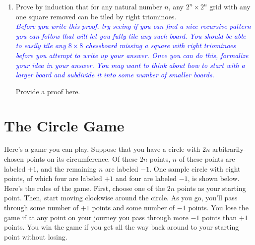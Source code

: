 \documentclass{article}
\renewcommand{\(}{\left(}
\renewcommand{\)}{\right)}
\theoremstyle{plain}
\theoremstyle{plain}
\theoremstyle{definition}
\newcommand{\annotate}[1]{\textit{\textcolor{blue}{#1}}}
\begin{document}
\begin{enumerate}[resume*]
    \item Prove by induction that for any natural number $n$, any $2^n \times 2^n$ grid with any one square removed can be tiled by right triominoes. \\

    \annotate{Before you write this proof, try seeing if you can  find a nice recursive pattern you can follow that will let you fully tile any such board. You should be able to easily tile any $8 \times 8$ chessboard missing a square with right triominoes before you attempt to write up your answer. Once you can do this, formalize your idea in your answer. You may want to think about how to start with a larger board and subdivide it into some number of smaller boards.}
    
    \begin{shaded}
    Provide a proof here.
    \end{shaded}
\end{enumerate}

\pagebreak

\section{The Circle Game}

Here's a game you can play. Suppose that you have a circle with $2n$ arbitrarily-chosen points on its circumference. Of these $2n$ points, $n$ of these points are labeled $+1$, and the remaining $n$ are labeled $-1$. One sample circle with eight points, of which four are labeled $+1$ and four are labeled $-1$, is shown below. \\

Here's the rules of the game. First, choose one of the $2n$ points as your starting point. Then, start moving clockwise around the circle. As you go, you'll pass through some number of $+1$ points and some number of $-1$ points. You lose the game if at any point on your journey you pass through more $-1$ points than $+1$ points. You win the game if you get all the way back around to your starting point without losing. \\
\end{document}
